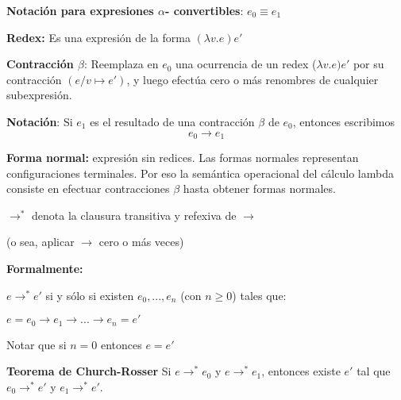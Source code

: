 \documentclass[handout]{beamer}
\begin{document}
\smallskip

\textbf{Notación para expresiones $\alpha$- convertibles}: $e_0\equiv e_1$

\smallskip

\textbf{Redex:} Es una expresión de la forma $(\lambda v.e) e'$

\smallskip

\textbf{Contracción $\beta$}: Reemplaza en $e_0$ una
ocurrencia de un redex ($\lambda v.e) e'$ por su contracción
$(e/v\mapsto e')$, y luego efectúa cero o más renombres de cualquier
subexpresión.

\clearpage

\textbf{Notación}: Si $e_1$ es el resultado de una contracción $\beta$ de $e_0$, entonces escribimos
\[e_0\rightarrow e_1\]

\smallskip

\textbf{Forma normal:} expresión sin redices.
Las formas normales representan configuraciones terminales.
Por eso la semántica operacional del cálculo lambda consiste
en efectuar contracciones $\beta$ hasta obtener formas normales.

\bigskip
\bigskip

$\rightarrow^*$ denota la clausura transitiva y refexiva de $\rightarrow$

(o sea, aplicar $\rightarrow$ cero o más veces)

\smallskip

\textbf{Formalmente:}

$e\rightarrow^* e'$ si y sólo si existen $e_0,...,e_{n}$ (con $n\geq 0$) tales que:

\quad$e=e_0\rightarrow e_1\rightarrow ... \rightarrow e_{n}= e'$

Notar que si $n = 0$ entonces $e=e'$

\clearpage
\smallskip

\textbf{Teorema de Church-Rosser} Si  $e\rightarrow^* e_0$  y $e\rightarrow^* e_1$,
entonces existe $e'$ tal que $e_0\rightarrow^* e'$ y $e_1\rightarrow^*  e'$.

\end{document}
